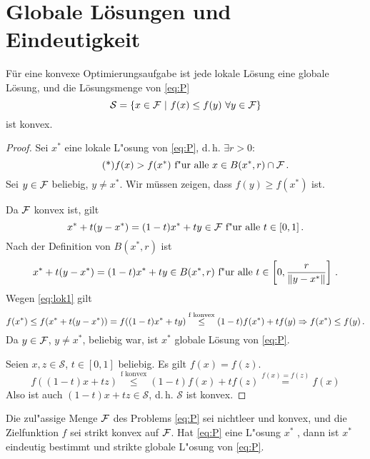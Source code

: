 \section{Globale Lösungen und Eindeutigkeit}

\begin{Satz}
F\"ur eine konvexe Optimierungsaufgabe ist jede lokale L\"osung eine globale L\"osung, und die L\"osungsmenge von \eqref{eq:P}
\begin{equation*}
	\mathcal{S}=\{ x\in\mathcal{F} ~\vert~ f(x)\leq f(y)~\forall y\in\mathcal{F}\}
\end{equation*}
ist konvex.
\end{Satz}

\begin{proof}
Sei $x^*$ eine lokale L"osung von \eqref{eq:P}, d.\,h. $\exists r > 0$:
\begin{equation}
 \label{eq:lok1}
 \tag{*}
f(x)>f(x^*) \text{ f"ur alle } x \in B(x^*,r) \cap \mathcal{F} \,.
\end{equation}
Sei $y \in \mathcal{F}$ beliebig, $y \neq x^*$. Wir müssen zeigen, dass $f(y)\geq f(x^*)$ ist.

Da $\mathcal{F}$ konvex ist, gilt 
\begin{equation}
x^*+t(y-x^*)= (1-t) x^* + ty \in \mathcal{F} \text{ f"ur alle }  t \in [0,1] \,.
\end{equation}
Nach der Definition von $B(x^*,r)$ ist
\begin{equation*}
x^*+t(y-x^*)= (1-t) x^* + ty \in B(x^*,r) \text{ f"ur alle }  t \in \left[0,\frac{r}{\left\lVert y-x^*\right\rVert}\right] \,.
\end{equation*}
Wegen \eqref{eq:lok1} gilt
\begin{equation*}
f(x^*)\leq f(x^*+t(y-x^*))=f((1-t)x^*+ty)\overset{\text{f konvex}}{\leq} (1-t)f(x^*)+tf(y) \\
\Rightarrow f(x^*)\leq f(y) \,.
\end{equation*}
Da $y\in \mathcal{F}$, $y \neq x^*$, beliebig war, ist $x^*$ globale Lösung von \eqref{eq:P}.

Seien $x,z \in \mathcal{S}$, $t \in [0,1]$ beliebig.
Es gilt $f(x)=f(z)$.
\begin{equation*}
f((1-t)x+tz)\overset{\text{f konvex}}{\leq} (1-t)f(x)+tf(z)\overset{f(x)=f(z)}{=} f(x)
\end{equation*}
Also ist auch $(1-t)x+tz \in \mathcal{S}$, d.\,h. $\mathcal{S}$ ist konvex.
\end{proof}

\begin{Satz}
Die zul"assige Menge $\mathcal{F}$ des Problems \eqref{eq:P} sei nichtleer und konvex, und die Zielfunktion $f$ sei strikt konvex auf $\mathcal{F}$. Hat \eqref{eq:P} eine L"osung $x^*$ , dann ist $x^*$ eindeutig bestimmt und strikte globale L"osung von \eqref{eq:P}.
\end{Satz}

